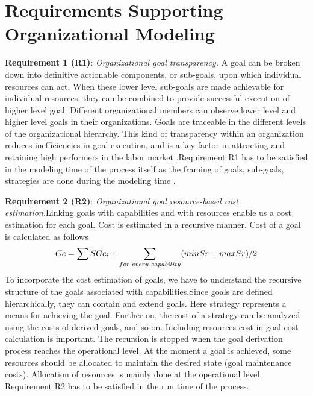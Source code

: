 \section{Requirements Supporting Organizational Modeling}
 
\hspace{4ex} \textbf{Requirement 1 (R1)}: \textit{Organizational goal transparency.} A goal can be broken down into definitive actionable components, or sub-goals, upon which individual resources can act. When these lower level sub-goals are made  achievable for individual resources, they can be combined to provide successful execution of higher level goal. Different organizational members can observe lower level and higher level goals in their organizations. Goals are traceable in the different levels of the organizational hierarchy. This kind of transparency within an organization reduces inefficiencies in goal execution, and is a key factor in attracting and retaining high  performers in the labor market \cite{McManus2007}.Requirement R1 has to be satisfied in the modeling time of the process itself as the framing of goals, sub-goals, strategies are done during the modeling time .

\hspace{4ex} \textbf{Requirement 2 (R2)}: \textit{Organizational goal resource-based cost estimation.}Linking goals with capabilities and with resources enable us a cost estimation for each goal. Cost is estimated in a recursive manner. Cost of a goal is calculated as follows  
\begin{equation}
	Gc = \sum SGc_i + \sum_{for\hspace{0.1cm}every\hspace{0.1cm}capability} (min Sr + max Sr)/2
\end{equation}
To incorporate the cost estimation of goals, we have to understand the recursive structure of the goals associated with capabilities.Since goals are defined hierarchically, they can contain and extend goals. Here strategy represents a means for achieving the goal. Further on, the cost of a strategy can be analyzed using the costs of derived  goals, and so on. Including resources cost in goal cost calculation is important. The recursion is stopped when the goal derivation process reaches the operational
level. At the moment a  goal is achieved, some resources should be allocated to maintain the desired state (goal maintenance costs)\cite{Mandic2010}. Allocation of resources is mainly done at the operational level, Requirement R2 has to be satisfied in the run time of the process.

